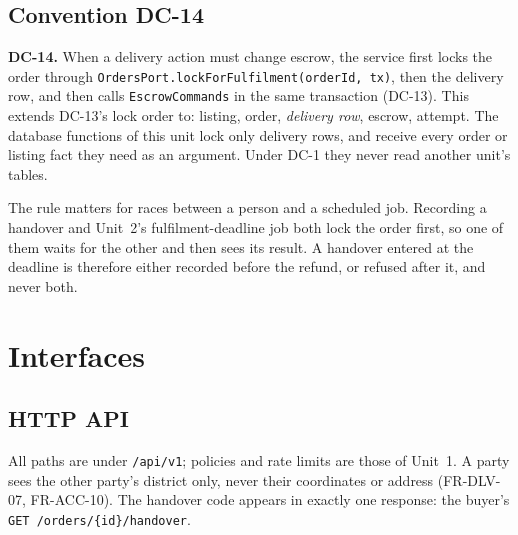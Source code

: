\documentclass[11pt,a4paper]{article}
\begin{document}
\subsection{Convention DC-14}
\label{sec:dc14}
\textbf{DC-14.} When a delivery action must change escrow, the service first locks the order through \texttt{OrdersPort.lockForFulfilment(orderId, tx)}, then the delivery row, and then calls \texttt{EscrowCommands} in the same transaction (DC-13). This extends DC-13's lock order to: listing, order, \emph{delivery row}, escrow, attempt. The database functions of this unit lock only delivery rows, and receive every order or listing fact they need as an argument. Under DC-1 they never read another unit's tables.

The rule matters for races between a person and a scheduled job. Recording a handover and Unit~2's fulfilment-deadline job both lock the order first, so one of them waits for the other and then sees its result. A handover entered at the deadline is therefore either recorded before the refund, or refused after it, and never both.
\section{Interfaces}

\subsection{HTTP API}
\label{sec:api}
All paths are under \texttt{/api/v1}; policies and rate limits are those of Unit~1. A party sees the other party's district only, never their coordinates or address (FR-DLV-07, FR-ACC-10). The handover code appears in exactly one response: the buyer's \texttt{GET /orders/\{id\}/handover}.
\end{document}
